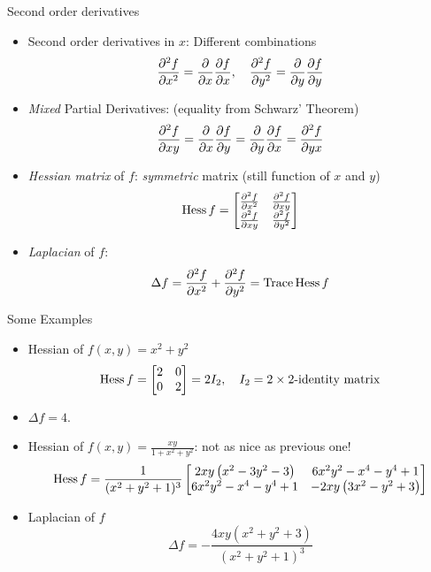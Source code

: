 \documentclass[8pt,dvipsnames]{beamer}
\begin{document}
\begin{frame}{Second order derivatives}
  \begin{itemize}
    \item Second order derivatives in $x$: Different combinations 
    $$
    \frac{\partial^{2}{f}}{\partial{x^2}} = \frac{\partial{}}{\partial{x}}\frac{\partial{f}}{\partial{x}}, \quad \frac{\partial^{2}{f}}{\partial{y^2}}=\frac{\partial{}}{\partial{y}}\frac{\partial{f}}{\partial{y}}
    $$
    \item \emph{Mixed} Partial Derivatives: (equality from Schwarz' Theorem)
    $$
    \frac{\partial^{2}{f}}{\partial{xy}} = \frac{\partial{}}{\partial{x}}\frac{\partial{f}}{\partial{y}} = \frac{\partial{}}{\partial{y}}\frac{\partial{f}}{\partial{x}} = \frac{\partial^{2}{f}}{\partial{yx}}
    $$
    \item \emph{Hessian matrix} of $f$: \emph{symmetric} matrix (still function of $x$ and $y$)
    $$
    \operatorname{Hess} f = \begin{bmatrix}
      \frac{\partial^{2}{f}}{\partial{x^2}} & \frac{\partial^{2}{f}}{\partial{xy}}\\
      \frac{\partial^{2}{f}}{\partial{xy}} & \frac{\partial^{2}{f}}{\partial{y^2}}
    \end{bmatrix}
    $$
    \item \emph{Laplacian} of $f$: 
    $$
    \Delta f = \frac{\partial^{2}{f}}{\partial{x^2}} + \frac{\partial^{2}{f}}{\partial{y^2}} = \text{Trace} \operatorname{Hess} f
    $$
  \end{itemize}
\end{frame}

\begin{frame}{Some Examples}
\begin{itemize}
  \item Hessian of $f(x,y) = x^2 + y^2$
  $$
  \operatorname{Hess} f = \begin{bmatrix}
    2 & 0\\
    0 & 2
  \end{bmatrix} = 2 I_2,\quad I_2 = 2\times 2\text{-identity matrix}
  $$
  \item $\Delta f = 4$.\vfill
  \item Hessian of $f(x,y) = \frac{xy}{1+x^2+y^2}$: not as nice as previous one!
  $$
  \operatorname{Hess} f = \frac{1}{(x^2+y^2+1)^3}
  \begin{bmatrix}
 2 x y \left(x^2-3 y^2-3\right) & 6 x^2 y^2-x^4-y^4+1 \\
 6 x^2 y^2-x^4-y^4+1 & -2 x y \left(3 x^2-y^2+3\right) 
  \end{bmatrix}
  $$
  \item Laplacian of $f$
  $$
  \Delta f = -\frac{4 x y \left(x^2+y^2+3\right)}{\left(x^2+y^2+1\right)^3}
  $$
\end{itemize}
\end{frame}
\end{document}
